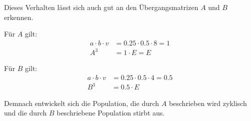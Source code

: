\begin{flushleft}
Dieses Verhalten lässt sich auch gut an den Übergangsmatrizen $A$ und $B$ erkennen.

Für $A$ gilt:
\begin{align}
    a\cdot b\cdot v&=0.25\cdot 0.5\cdot 8=1 \\
    A^3&=1\cdot E=E
\end{align}

Für $B$ gilt:
\begin{align}
    a\cdot b\cdot v&=0.25\cdot 0.5\cdot 4=0.5 \\
    B^3&=0.5\cdot E
\end{align}

Demnach entwickelt sich die Population, die durch $A$ beschrieben wird zyklisch
und die durch $B$ beschriebene Population stirbt aus.
\end{flushleft}
